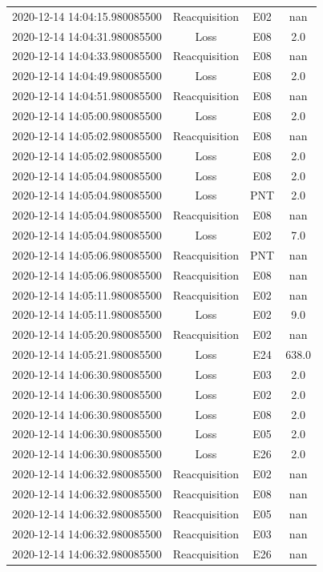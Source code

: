 \begin{enumerate}
\begin{longtabu}{cccc}
2020{-}12{-}14 14:04:15.980085500&Reacquisition&E02&nan\\%
2020{-}12{-}14 14:04:31.980085500&Loss&E08&2.0\\%
2020{-}12{-}14 14:04:33.980085500&Reacquisition&E08&nan\\%
2020{-}12{-}14 14:04:49.980085500&Loss&E08&2.0\\%
2020{-}12{-}14 14:04:51.980085500&Reacquisition&E08&nan\\%
2020{-}12{-}14 14:05:00.980085500&Loss&E08&2.0\\%
2020{-}12{-}14 14:05:02.980085500&Reacquisition&E08&nan\\%
2020{-}12{-}14 14:05:02.980085500&Loss&E08&2.0\\%
2020{-}12{-}14 14:05:04.980085500&Loss&E08&2.0\\%
2020{-}12{-}14 14:05:04.980085500&Loss&PNT&2.0\\%
2020{-}12{-}14 14:05:04.980085500&Reacquisition&E08&nan\\%
2020{-}12{-}14 14:05:04.980085500&Loss&E02&7.0\\%
2020{-}12{-}14 14:05:06.980085500&Reacquisition&PNT&nan\\%
2020{-}12{-}14 14:05:06.980085500&Reacquisition&E08&nan\\%
2020{-}12{-}14 14:05:11.980085500&Reacquisition&E02&nan\\%
2020{-}12{-}14 14:05:11.980085500&Loss&E02&9.0\\%
2020{-}12{-}14 14:05:20.980085500&Reacquisition&E02&nan\\%
2020{-}12{-}14 14:05:21.980085500&Loss&E24&638.0\\%
2020{-}12{-}14 14:06:30.980085500&Loss&E03&2.0\\%
2020{-}12{-}14 14:06:30.980085500&Loss&E02&2.0\\%
2020{-}12{-}14 14:06:30.980085500&Loss&E08&2.0\\%
2020{-}12{-}14 14:06:30.980085500&Loss&E05&2.0\\%
2020{-}12{-}14 14:06:30.980085500&Loss&E26&2.0\\%
2020{-}12{-}14 14:06:32.980085500&Reacquisition&E02&nan\\%
2020{-}12{-}14 14:06:32.980085500&Reacquisition&E08&nan\\%
2020{-}12{-}14 14:06:32.980085500&Reacquisition&E05&nan\\%
2020{-}12{-}14 14:06:32.980085500&Reacquisition&E03&nan\\%
2020{-}12{-}14 14:06:32.980085500&Reacquisition&E26&nan\\%

\end{longtabu}
\end{enumerate}
